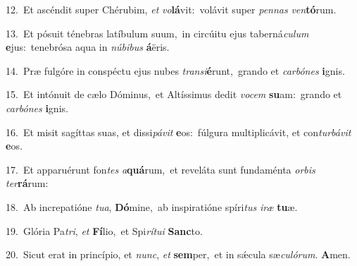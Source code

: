 {\numbfont\textcolor{\numbcolor}{12.}}~Et ascéndit super Chérubim, \textit{et} \textit{vo}\-\textbf{lá}vit:~\star volávit super \textit{pen}\-\textit{nas} \textit{ven}\-\textbf{tó}rum.\par
{\numbfont\textcolor{\numbcolor}{13.}}~Et pósuit ténebras latíbulum suum,~\dagger in circúitu ejus taberná\-\textit{cu}\-\textit{lum} \textbf{e}\-jus:~\star tenebrósa aqua in \textit{nú}\-\textit{bi}\textit{bus} \textbf{á}\-ëris.\par
{\numbfont\textcolor{\numbcolor}{14.}}~Præ fulgóre in conspéctu ejus nubes \textit{trans}\-\textit{i}\textbf{é}runt,~\star grando et \textit{car}\-\textit{bó}\textit{nes} \textbf{i}\-gnis.\par
{\numbfont\textcolor{\numbcolor}{15.}}~Et intónuit de cælo Dóminus,~\dagger et Altíssimus dedit \textit{vo}\-\textit{cem} \textbf{su}\-am:~\star grando et \textit{car}\-\textit{bó}\textit{nes} \textbf{i}\-gnis.\par
{\numbfont\textcolor{\numbcolor}{16.}}~Et misit sagíttas suas, et dissi\-\textit{pá}\-\textit{vit} \textbf{e}\-os:~\star fúlgura multiplicávit, et con\-\textit{tur}\-\textit{bá}\textit{vit} \textbf{e}\-os.\par
{\numbfont\textcolor{\numbcolor}{17.}}~Et apparuérunt fon\textit{tes} \textit{a}\-\textbf{quá}rum,~\star et reveláta sunt fundaménta \textit{or}\-\textit{bis} \textit{ter}\-\textbf{rá}rum:\par
{\numbfont\textcolor{\numbcolor}{18.}}~Ab increpatióne \textit{tu}\-\textit{a}, \textbf{Dó}\-mine,~\star ab inspiratióne spíri\textit{tus} \textit{i}\-\textit{ræ} \textbf{tu}\-æ.\par
{\numbfont\textcolor{\numbcolor}{19.}}~Glória Pa\-\textit{tri}\-, \textit{et} \textbf{Fí}\-lio,~\star et Spi\-\textit{rí}\-\textit{tu}\textit{i} \textbf{Sanc}\-to.\par
{\numbfont\textcolor{\numbcolor}{20.}}~Sicut erat in princípio, et \textit{nunc}\-, \textit{et} \textbf{sem}\-per,~\star et in sǽcula sæ\-\textit{cu}\-\textit{ló}\textit{rum}. \textbf{A}\-men.\par
